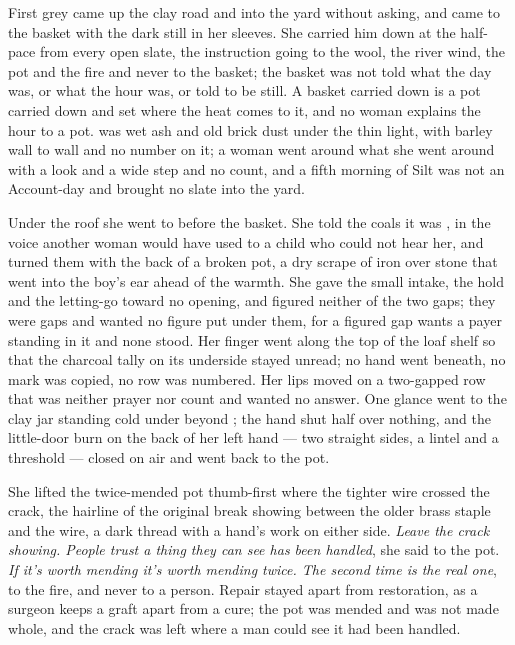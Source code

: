 \scenebreak

First grey came up the clay road and into the yard without asking, and  came to the basket with the dark still in her sleeves. She carried him down  at the half-pace from every open slate, the instruction going to the wool, the river wind, the pot and the fire and never to the basket; the basket was not told what the day was, or what the hour was, or told to be still. A basket carried down is a pot carried down and set where the heat comes to it, and no woman explains the hour to a pot.  was wet ash and old brick dust under the thin light, with barley wall to wall and no number on it; a woman went around what she went around with a look and a wide step and no count, and a fifth morning of Silt was not an Account-day and brought no slate into the yard.

Under the roof she went to  before the basket. She told the coals it was , in the voice another woman would have used to a child who could not hear her, and turned them with the back of a broken pot, a dry scrape of iron over stone that went into the boy's ear ahead of the warmth. She gave the small intake, the hold and the letting-go toward no opening, and figured neither of the two gaps; they were gaps and wanted no figure put under them, for a figured gap wants a payer standing in it and none stood. Her finger went along the top of the loaf shelf so that the charcoal tally on its underside stayed unread; no hand went beneath, no mark was copied, no row was numbered. Her lips moved on a two-gapped row that was neither prayer nor count and wanted no answer. One glance went to the clay jar standing cold under  beyond ; the hand shut half over nothing, and the little-door burn on the back of her left hand --- two straight sides, a lintel and a threshold --- closed on air and went back to the pot.

She lifted the twice-mended pot thumb-first where the tighter wire crossed the crack, the hairline of the original break showing between the older brass staple and the wire, a dark thread with a hand's work on either side. \emph{Leave the crack showing. People trust a thing they can see has been handled}, she said to the pot. \emph{If it's worth mending it's worth mending twice. The second time is the real one}, to the fire, and never to a person. Repair stayed apart from restoration, as a surgeon keeps a graft apart from a cure; the pot was mended and was not made whole, and the crack was left where a man could see it had been handled.

